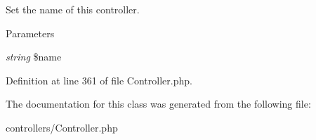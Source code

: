 Set the name of this controller. 


\begin{DoxyParams}{Parameters}
\item[{\em string}]\$name \end{DoxyParams}


Definition at line 361 of file Controller.php.



The documentation for this class was generated from the following file:\begin{DoxyCompactItemize}
\item 
controllers/Controller.php\end{DoxyCompactItemize}
